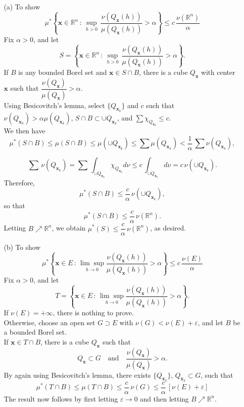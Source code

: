 \documentclass[a4paper,11pt]{article}
\begin{document}
	\begin{enumerate}
		\item [(a)]
			To show
				$$\mu^*\left\{ \mathbf{x} \in \mathbb{R}^n
				\,:\,
				\underset{h > 0}{\sup}\,\frac{\nu(Q_{\mathbf{x}}(h))}{\mu(Q_{\mathbf{x}}(h))} > \alpha \right\}
				\leq c\,\frac{\nu(\mathbb{R}^n)}{\alpha}$$
			Fix $\alpha > 0$, and let
				$$S
				= \left\{
				\mathbf{x} \in \mathbb{R}^n
				\,:\,
				\underset{h > 0}{\sup}\,\frac{\nu(Q_{\mathbf{x}}(h))}{\mu(Q_{\mathbf{x}}(h))}
				> \alpha
				\right\}.$$
			If $B$ is any bounded Borel set and $\mathbf{x} \in S \cap B$, there is a cube $Q_{\mathbf{x}}$ with center $\mathbf{x}$ such that $\dfrac{\nu(Q_{\mathbf{x}})}{\mu(Q_{\mathbf{x}})} > \alpha$.\\
			Using Besicovitch’s lemma, select $\{Q_{\mathbf{x}_k}\}$ and $c$ such that $\nu(Q_{\mathbf{x}_k}) > \alpha \mu(Q_{\mathbf{x}_k})$, $S \cap B \subset \cup Q_{\mathbf{x}_k}$, and $\sum \chi_{Q_{\mathbf{x}_k}} \leq c$.\\
			We then have
				$$\mu^*(S \cap B)
				\leq \mu(S \cap B)
				\leq \mu(\cup Q_{\mathbf{x}_k})
				\leq \sum \mu(Q_{\mathbf{x}_k})
				< \frac{1}{\alpha} \,\sum \nu(Q_{\mathbf{x}_k}),$$

				$$\sum\,\nu(Q_{\mathbf{x}_k})
				= \sum\,\int_{\cup Q_{\mathbf{x}_k}} \chi_{Q_{\mathbf{x}_k}} d\nu
				\leq c\,\int_{\cup Q_{\mathbf{x}_k}} d\nu
				= c\,\nu(\cup Q_{\mathbf{x}_k}).$$
			Therefore,
				$$\mu^*(S \cap B) \leq \frac{c}{\alpha}\,\nu(\cup Q_{\mathbf{x}_k}),$$
			so that
				$$\mu^*(S \cap B) \leq \frac{c}{\alpha}\,\nu(\mathbb{R}^n).$$
			Letting $B \nearrow \mathbb{R}^n$, we obtain $\mu^*(S) \leq \dfrac{c}{\alpha}\,\nu(\mathbb{R}^n)$, as desired.\

		\item [(b)]
			To show
				$$\mu^* \left\{\mathbf{x} \in E
				\,:\,
				\underset{h \to 0}{\lim \sup}
				\frac{\nu(Q_{\mathbf{x}}(h))}{\mu(Q_{\mathbf{x}}(h))} > \alpha\right\}
				\leq c\,\frac{\nu(E)}{\alpha}$$
			Fix $\alpha > 0$, and let
				$$T
				= \left\{
				\mathbf{x} \in E
				\,:\,
				\underset{h \to 0}{\lim \sup}
				\frac{\nu(Q_{\mathbf{x}}(h))}{\mu(Q_{\mathbf{x}}(h))}
				> \alpha\right\}.$$
			If $\nu(E) = +\infty$, there is nothing to prove.\\
			Otherwise, choose an open set $G \supset E$ with $\nu(G) < \nu(E) + \varepsilon$, and let $B$ be a bounded Borel set.\\
			If $\mathbf{x} \in T \cap B$, there is a cube $Q_{\mathbf{x}}$ such that 
				$$Q_{\mathbf{x}} \subset G
				\quad \text{and} \quad
				\frac{\nu(Q_{\mathbf{x}})}{\mu(Q_{\mathbf{x}})} > \alpha.$$
			By again using Besicovitch’s lemma, there exists $\{Q_{\mathbf{x}_k}\}$, $Q_{\mathbf{x}_k} \subset G$, such that
				$$\mu^*(T \cap B)
				\leq \mu(T \cap B)
				\leq \frac{c}{\alpha}\,\nu(G)
				\leq \frac{c}{\alpha}\,[\nu(E) + \varepsilon]$$
			The result now follows by first letting $\varepsilon \to 0$ and then letting $B \nearrow \mathbb{R}^n$.
	\end{enumerate}
\end{document}

